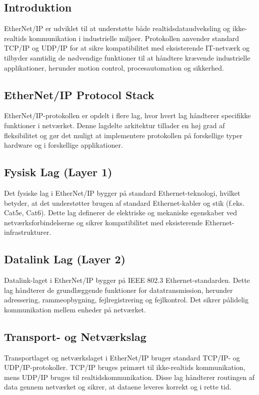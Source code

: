 \subsection{Introduktion}
EtherNet/IP er udviklet til at understøtte både realtidsdataudveksling og ikke-realtids kommunikation i industrielle miljøer. Protokollen anvender standard TCP/IP og UDP/IP for at sikre kompatibilitet med eksisterende IT-netværk og tilbyder samtidig de nødvendige funktioner til at håndtere krævende industrielle applikationer, herunder motion control, procesautomation og sikkerhed.

\subsection{EtherNet/IP Protocol Stack}
EtherNet/IP-protokollen er opdelt i flere lag, hvor hvert lag håndterer specifikke funktioner i netværket. Denne lagdelte arkitektur tillader en høj grad af fleksibilitet og gør det muligt at implementere protokollen på forskellige typer hardware og i forskellige applikationer.

\subsection*{Fysisk Lag (Layer 1)}
Det fysiske lag i EtherNet/IP bygger på standard Ethernet-teknologi, hvilket betyder, at det understøtter brugen af standard Ethernet-kabler og stik (f.eks. Cat5e, Cat6). Dette lag definerer de elektriske og mekaniske egenskaber ved netværksforbindelserne og sikrer kompatibilitet med eksisterende Ethernet-infrastrukturer.

\subsection*{Datalink Lag (Layer 2)}
Datalink-laget i EtherNet/IP bygger på IEEE 802.3 Ethernet-standarden. Dette lag håndterer de grundlæggende funktioner for datatransmission, herunder adressering, rammeopbygning, fejlregistrering og fejlkontrol. Det sikrer pålidelig kommunikation mellem enheder på netværket.

\subsection*{Transport- og Netværkslag}
Transportlaget og netværkslaget i EtherNet/IP bruger standard TCP/IP- og UDP/IP-protokoller. TCP/IP bruges primært til ikke-realtids kommunikation, mens UDP/IP bruges til realtidskommunikation. Disse lag håndterer routingen af data gennem netværket og sikrer, at dataene leveres korrekt og i rette tid.

